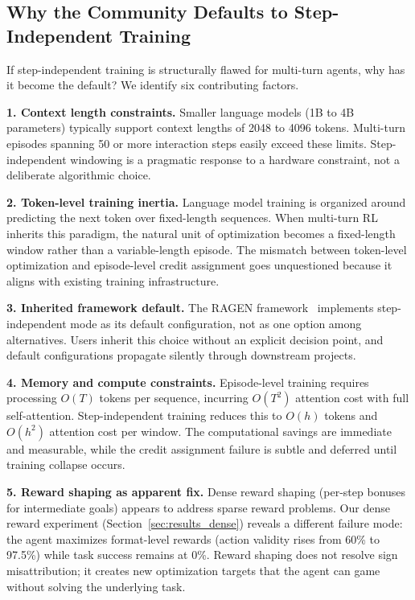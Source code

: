\subsection{Why the Community Defaults to Step-Independent Training}
\label{app:why_defaults}

If step-independent training is structurally flawed for multi-turn agents, why has it become the default? We identify six contributing factors.

\textbf{1. Context length constraints.} Smaller language models (1B to 4B parameters) typically support context lengths of 2048 to 4096 tokens. Multi-turn episodes spanning 50 or more interaction steps easily exceed these limits. Step-independent windowing is a pragmatic response to a hardware constraint, not a deliberate algorithmic choice.

\textbf{2. Token-level training inertia.} Language model training is organized around predicting the next token over fixed-length sequences. When multi-turn RL inherits this paradigm, the natural unit of optimization becomes a fixed-length window rather than a variable-length episode. The mismatch between token-level optimization and episode-level credit assignment goes unquestioned because it aligns with existing training infrastructure.

\textbf{3. Inherited framework default.} The RAGEN framework~\citep{ragen2025} implements step-independent mode as its default configuration, not as one option among alternatives. Users inherit this choice without an explicit decision point, and default configurations propagate silently through downstream projects.

\textbf{4. Memory and compute constraints.} Episode-level training requires processing $O(T)$ tokens per sequence, incurring $O(T^2)$ attention cost with full self-attention. Step-independent training reduces this to $O(h)$ tokens and $O(h^2)$ attention cost per window. The computational savings are immediate and measurable, while the credit assignment failure is subtle and deferred until training collapse occurs.

\textbf{5. Reward shaping as apparent fix.} Dense reward shaping (per-step bonuses for intermediate goals) appears to address sparse reward problems. Our dense reward experiment (Section~\ref{sec:results_dense}) reveals a different failure mode: the agent maximizes format-level rewards (action validity rises from 60\% to 97.5\%) while task success remains at 0\%. Reward shaping does not resolve sign misattribution; it creates new optimization targets that the agent can game without solving the underlying task.

